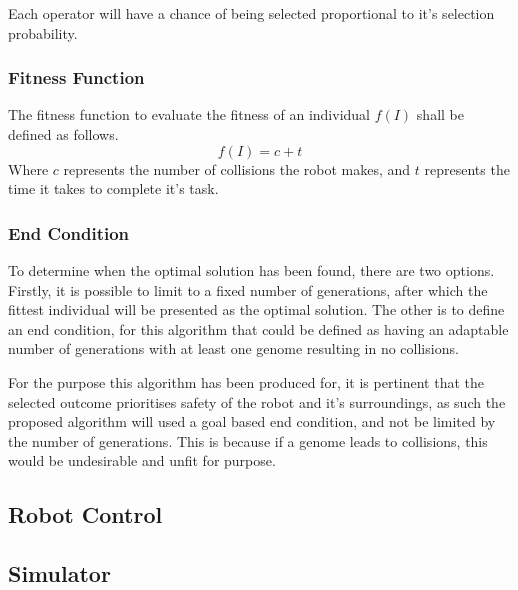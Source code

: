 Each operator will have a chance of being selected proportional to it's selection probability.
\subsubsection{Fitness Function}
The fitness function to evaluate the fitness of an individual $f(I)$ shall be defined as follows.
\begin{equation}
	f(I) = c + t\label{eq:fitnessFunction}
\end{equation}
Where $c$ represents the number of collisions the robot makes, and $t$ represents the time it takes to complete it's task.
\subsubsection{End Condition}
To determine when the optimal solution has been found, there are two options. Firstly, it is possible to limit to a fixed number of generations, after which the fittest individual will be presented as the optimal solution. The other is to define an end condition, for this algorithm that could be defined as having an adaptable number of generations with at least one genome resulting in no collisions.

For the purpose this algorithm has been produced for, it is pertinent that the selected outcome prioritises safety of the robot and it's surroundings, as such the proposed algorithm will used a goal based end condition, and not be limited by the number of generations. This is because if a genome leads to collisions, this would be undesirable and unfit for purpose.

\subsection{Robot Control}
\subsection{Simulator}